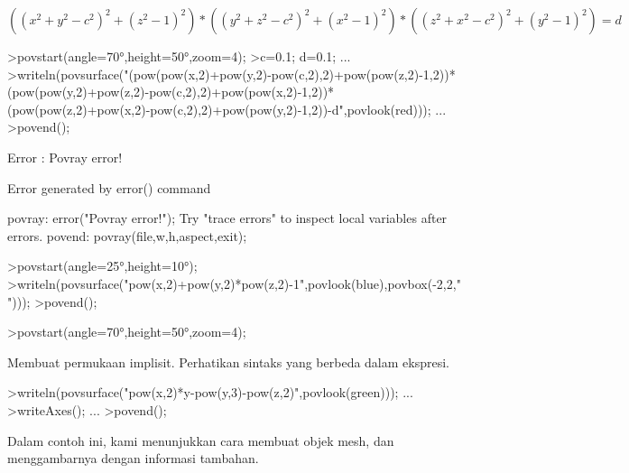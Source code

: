 \documentclass[12pt,arial,letterpaper]{book}
\begin{document}
\begin{eulernootebook}
\begin{eulercomment}
\begin{eulercomment}
\begin{eulernootebook}
\begin{eulercomment}
\begin{eulercomment}
\begin{eulercomment}
\begin{eulercomment}
\begin{eulercomment}
\begin{eulercomment}
\begin{eulercomment}
\begin{eulernotebook}
\begin{eulercomment}
\end{eulercomment}
\begin{eulerformula}
\[
((x^2+y^2-c^2)^2+(z^2-1)^2)*((y^2+z^2-c^2)^2+(x^2-1)^2)*((z^2+x^2-c^2)^2+(y^2-1)^2)=d
\]
\end{eulerformula}
\begin{eulerprompt}
>povstart(angle=70°,height=50°,zoom=4);
>c=0.1; d=0.1; ...
>writeln(povsurface("(pow(pow(x,2)+pow(y,2)-pow(c,2),2)+pow(pow(z,2)-1,2))*(pow(pow(y,2)+pow(z,2)-pow(c,2),2)+pow(pow(x,2)-1,2))*(pow(pow(z,2)+pow(x,2)-pow(c,2),2)+pow(pow(y,2)-1,2))-d",povlook(red))); ...
>povend();
\end{eulerprompt}
\begin{euleroutput}
  Error : Povray error!
  
  Error generated by error() command
  
  povray:
      error("Povray error!");
  Try "trace errors" to inspect local variables after errors.
  povend:
      povray(file,w,h,aspect,exit); 
\end{euleroutput}
\begin{eulerprompt}
>povstart(angle=25°,height=10°); 
>writeln(povsurface("pow(x,2)+pow(y,2)*pow(z,2)-1",povlook(blue),povbox(-2,2,"")));
>povend();
\end{eulerprompt}
\begin{eulerprompt}
>povstart(angle=70°,height=50°,zoom=4);
\end{eulerprompt}
\begin{eulercomment}
Membuat permukaan implisit. Perhatikan sintaks yang berbeda dalam
ekspresi.
\end{eulercomment}
\begin{eulerprompt}
>writeln(povsurface("pow(x,2)*y-pow(y,3)-pow(z,2)",povlook(green))); ...
>writeAxes(); ...
>povend();
\end{eulerprompt}
\begin{eulercomment}
Dalam contoh ini, kami menunjukkan cara membuat objek mesh, dan
menggambarnya dengan informasi tambahan.


\end{eulercomment}
\end{eulernotebook}
\end{eulercomment}
\end{eulercomment}
\end{eulercomment}
\end{eulercomment}
\end{eulercomment}
\end{eulercomment}
\end{eulercomment}
\end{eulernootebook}
\end{eulercomment}
\end{eulercomment}
\end{eulernootebook}
\end{document}

